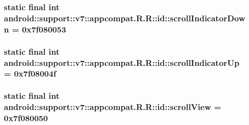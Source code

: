 \hypertarget{classandroid_1_1support_1_1v7_1_1appcompat_1_1_r_1_1id_8c898ecef26395ae87d51f45e345d2a4}{
\subsubsection[{scrollIndicatorDown}]{\setlength{\rightskip}{0pt plus 5cm}static final int android::support::v7::appcompat.R.R::id::scrollIndicatorDown = 0x7f080053}}
\label{classandroid_1_1support_1_1v7_1_1appcompat_1_1_r_1_1id_8c898ecef26395ae87d51f45e345d2a4}


\hypertarget{classandroid_1_1support_1_1v7_1_1appcompat_1_1_r_1_1id_fad825b3b572d052312cf45b17f80b56}{
\subsubsection[{scrollIndicatorUp}]{\setlength{\rightskip}{0pt plus 5cm}static final int android::support::v7::appcompat.R.R::id::scrollIndicatorUp = 0x7f08004f}}
\label{classandroid_1_1support_1_1v7_1_1appcompat_1_1_r_1_1id_fad825b3b572d052312cf45b17f80b56}


\hypertarget{classandroid_1_1support_1_1v7_1_1appcompat_1_1_r_1_1id_5381944d6f7d389cc7821c5cd06ce43b}{
\subsubsection[{scrollView}]{\setlength{\rightskip}{0pt plus 5cm}static final int android::support::v7::appcompat.R.R::id::scrollView = 0x7f080050}}
\label{classandroid_1_1support_1_1v7_1_1appcompat_1_1_r_1_1id_5381944d6f7d389cc7821c5cd06ce43b}


